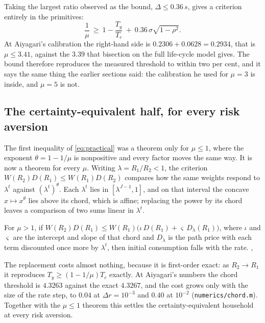 Taking the largest ratio observed as the bound, $\Delta\le0.36\,s$, gives a criterion entirely in
the primitives:
\begin{equation}\label{eq:practical}
  \frac1\mu\ \ge\ 1-\frac{T_y}{T_c}\ +\ 0.36\,\sigma\sqrt{1-\rho^2}.
\end{equation}
At Aiyagari's calibration the right-hand side is $0.2306+0.0628=0.2934$, that is $\mu\le3.41$,
against the $3.39$ that bisection on the full life-cycle model gives. The bound therefore
reproduces the measured threshold to within two per cent, and it says the same thing the earlier
sections said: the calibration he used for $\mu=3$ is inside, and $\mu=5$ is not.

\subsection{The certainty-equivalent half, for every risk aversion}

The first inequality of \eqref{eq:practical} was a theorem only for $\mu\le1$, where the exponent
$\theta=1-1/\mu$ is nonpositive and every factor moves the same way. It is now a theorem for every
$\mu$. Writing $\lambda=R_1/R_2<1$, the criterion $W(R_2)D(R_1)\le W(R_1)D(R_2)$ compares how the
same weights respond to $\lambda^t$ against $(\lambda^t)^\theta$. Each $\lambda^t$ lies in
$[\lambda^{J-1},1]$, and on that interval the concave $x\mapsto x^\theta$ lies above its chord,
which is affine; replacing the power by its chord leaves a comparison of two sums linear in
$\lambda^t$.

\begin{theorem}\label{thm:chord}
For $\mu>1$, if
$W(R_2)D(R_1)\le W(R_1)\bigl(\iota\,D(R_1)+\varsigma\,D_\lambda(R_1)\bigr)$, where $\iota$ and
$\varsigma$ are the intercept and slope of that chord and $D_\lambda$ is the path price with each
term discounted once more by $\lambda^t$, then initial consumption falls with the rate.
,
\end{theorem}

The replacement costs almost nothing, because it is first-order exact: as $R_2\to R_1$ it
reproduces $T_y\ge(1-1/\mu)T_c$ exactly. At Aiyagari's numbers the chord threshold is $4.3263$
against the exact $4.3267$, and the cost grows only with the size of the rate step, to $0.04$ at
$\Delta r=10^{-3}$ and $0.40$ at $10^{-2}$ (\texttt{numerics/chord.m}). Together with the $\mu\le1$
theorem this settles the certainty-equivalent household at every risk aversion.

